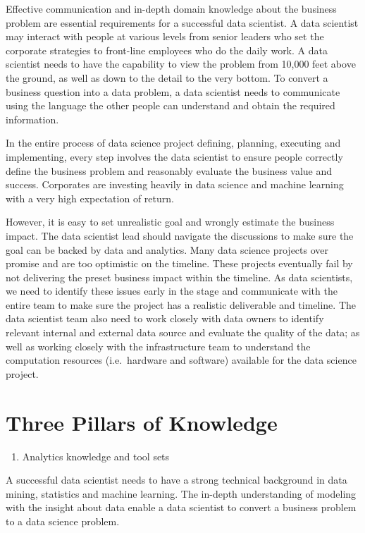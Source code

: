 \documentclass[12pt,]{krantz}
\providecommand{\tightlist}{%
  \setlength{\itemsep}{0pt}\setlength{\parskip}{0pt}}
\theoremstyle{definition}
\theoremstyle{definition}
\theoremstyle{definition}
\theoremstyle{remark}
\begin{document}
Effective communication and in-depth domain knowledge about the business
problem are essential requirements for a successful data scientist. A
data scientist may interact with people at various levels from senior
leaders who set the corporate strategies to front-line employees who do
the daily work. A data scientist needs to have the capability to view
the problem from 10,000 feet above the ground, as well as down to the
detail to the very bottom. To convert a business question into a data
problem, a data scientist needs to communicate using the language the
other people can understand and obtain the required information.

In the entire process of data science project defining, planning,
executing and implementing, every step involves the data scientist to
ensure people correctly define the business problem and reasonably
evaluate the business value and success. Corporates are investing
heavily in data science and machine learning with a very high
expectation of return.

However, it is easy to set unrealistic goal and wrongly estimate the
business impact. The data scientist lead should navigate the discussions
to make sure the goal can be backed by data and analytics. Many data
science projects over promise and are too optimistic on the timeline.
These projects eventually fail by not delivering the preset business
impact within the timeline. As data scientists, we need to identify
these issues early in the stage and communicate with the entire team to
make sure the project has a realistic deliverable and timeline. The data
scientist team also need to work closely with data owners to identify
relevant internal and external data source and evaluate the quality of
the data; as well as working closely with the infrastructure team to
understand the computation resources (i.e.~hardware and software)
available for the data science project.

\section{Three Pillars of Knowledge}\label{three-pillars-of-knowledge}

\begin{enumerate}
\def\labelenumi{(\arabic{enumi})}
\tightlist
\item
  Analytics knowledge and tool sets
\end{enumerate}

A successful data scientist needs to have a strong technical background
in data mining, statistics and machine learning. The in-depth
understanding of modeling with the insight about data enable a data
scientist to convert a business problem to a data science problem.
\end{document}
